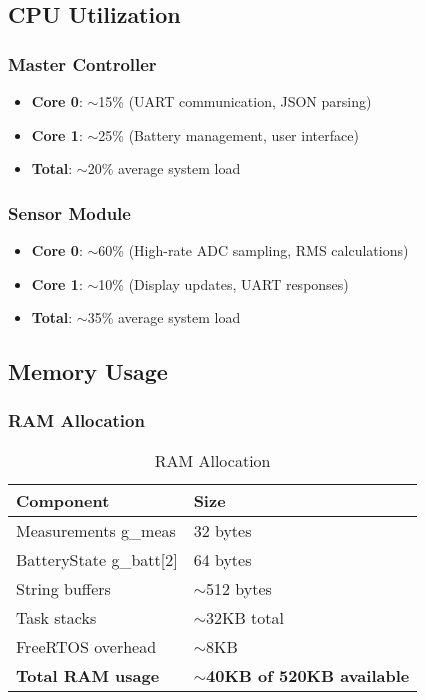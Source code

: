 \documentclass[11pt,a4paper]{article}
\begin{document}
\subsection{CPU Utilization}

\subsubsection{Master Controller}
\begin{itemize}
    \item \textbf{Core 0}: $\sim$15\% (UART communication, JSON parsing)
    \item \textbf{Core 1}: $\sim$25\% (Battery management, user interface)
    \item \textbf{Total}: $\sim$20\% average system load
\end{itemize}

\subsubsection{Sensor Module}
\begin{itemize}
    \item \textbf{Core 0}: $\sim$60\% (High-rate ADC sampling, RMS calculations)
    \item \textbf{Core 1}: $\sim$10\% (Display updates, UART responses)
    \item \textbf{Total}: $\sim$35\% average system load
\end{itemize}

\subsection{Memory Usage}

\subsubsection{RAM Allocation}
\begin{table}[H]
\centering
\begin{tabular}{@{}ll@{}}
\toprule
Component & Size \\ \midrule
Measurements g\_meas & 32 bytes \\
BatteryState g\_batt[2] & 64 bytes \\
String buffers & $\sim$512 bytes \\
Task stacks & $\sim$32KB total \\
FreeRTOS overhead & $\sim$8KB \\
\textbf{Total RAM usage} & \textbf{$\sim$40KB of 520KB available} \\ \bottomrule
\end{tabular}
\caption{RAM Allocation}
\end{table}
\end{document}
